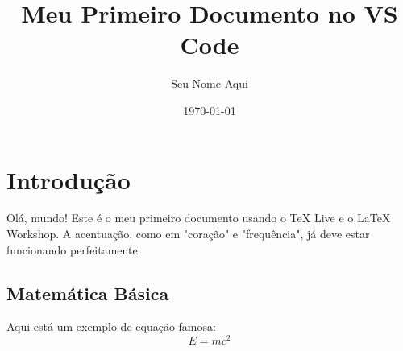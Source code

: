 \documentclass[12pt, a4paper]{article}
\title{Meu Primeiro Documento no VS Code}
\author{Seu Nome Aqui}
\date{\today}
\begin{document}
\maketitle

\section{Introdução}
Olá, mundo! Este é o meu primeiro documento usando o TeX Live e o LaTeX Workshop. A acentuação, como em "coração" e "frequência", já deve estar funcionando perfeitamente.

\subsection{Matemática Básica}
Aqui está um exemplo de equação famosa:
$$ E = mc^2 $$
\end{document}
